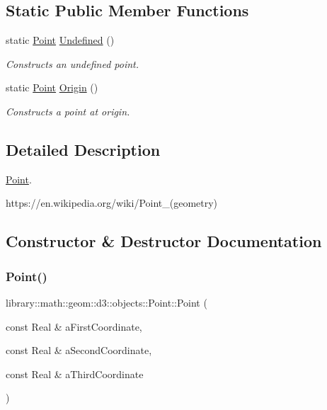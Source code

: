 \subsection*{Static Public Member Functions}
\begin{DoxyCompactItemize}
\item 
static \hyperlink{classlibrary_1_1math_1_1geom_1_1d3_1_1objects_1_1_point}{Point} \hyperlink{classlibrary_1_1math_1_1geom_1_1d3_1_1objects_1_1_point_a7c4c9c71f9b29b85925d8a7ed4943501}{Undefined} ()
\begin{DoxyCompactList}\small\item\em Constructs an undefined point. \end{DoxyCompactList}\item 
static \hyperlink{classlibrary_1_1math_1_1geom_1_1d3_1_1objects_1_1_point}{Point} \hyperlink{classlibrary_1_1math_1_1geom_1_1d3_1_1objects_1_1_point_ab2a38e285c562e50bf350272c083986f}{Origin} ()
\begin{DoxyCompactList}\small\item\em Constructs a point at origin. \end{DoxyCompactList}\end{DoxyCompactItemize}


\subsection{Detailed Description}
\hyperlink{classlibrary_1_1math_1_1geom_1_1d3_1_1objects_1_1_point}{Point}. 

https\+://en.wikipedia.\+org/wiki/\+Point\+\_\+(geometry) 

\subsection{Constructor \& Destructor Documentation}
\mbox{\label{classlibrary_1_1math_1_1geom_1_1d3_1_1objects_1_1_point_a617e690ab6091af3de729cee337e309e}} 
\subsubsection{\texorpdfstring{Point()}{Point()}\hspace{0.1cm}{\footnotesize\ttfamily [1/2]}}
{\footnotesize\ttfamily library\+::math\+::geom\+::d3\+::objects\+::\+Point\+::\+Point (\begin{DoxyParamCaption}\item[{const Real \&}]{a\+First\+Coordinate,  }\item[{const Real \&}]{a\+Second\+Coordinate,  }\item[{const Real \&}]{a\+Third\+Coordinate }\end{DoxyParamCaption})}



